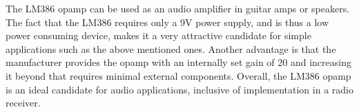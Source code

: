 \documentclass[journal]{IEEEtran}
\begin{document}
\noindent The LM386 opamp can be used as an audio amplifier in guitar amps or speakers. The fact that the LM386 requires only a 9V power supply, and is thus a low power consuming device, makes it a very attractive candidate for simple applications such as the above mentioned ones. Another advantage is that the manufacturer provides the opamp with an internally set gain of 20 and increasing it beyond that requires minimal external components. Overall, the LM386 opamp is an ideal candidate for audio applications, inclusive of implementation in a radio receiver.









\printbibliography
\end{document}
